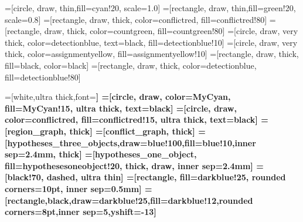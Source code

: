 =[circle, draw, thin,fill=cyan!20, scale=1.0]
=[rectangle, draw, thin,fill=green!20, scale=0.8]
=[rectangle, draw, thick, color=conflictred, fill=conflictred!80]
=[rectangle, draw, thick, color=countgreen, fill=countgreen!80]
=[circle, draw, very thick, color=detectionblue, text=black, fill=detectionblue!10]
=[circle, draw, very thick, color=assignmentyellow, fill=assignmentyellow!10]
=[rectangle, draw, thick, fill=black, color=black]
=[rectangle, draw, thick, color=detectionblue, fill=detectionblue!80]


=[white,ultra thick,font=\bfseries]
=[circle, draw, color=MyCyan, fill=MyCyan!15, ultra thick, text=black]
=[circle, draw, color=conflictred, fill=conflictred!15, ultra thick, text=black]
=[region_graph, thick]
=[conflict_graph, thick]
=[hypotheses_three_objects,draw=blue!100,fill=blue!10,inner sep=2.4mm, thick]
=[hypotheses_one_object, fill=hypothesesoneobject!20, thick, draw, inner
sep=2.4mm]
=[black!70, dashed, ultra thin]
=[rectangle, fill=darkblue!25, rounded corners=10pt, inner sep=0.5mm]
=[rectangle,black,draw=darkblue!25,fill=darkblue!12,rounded corners=8pt,inner
sep=5,yshift=-13]

